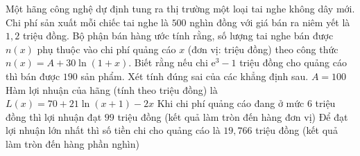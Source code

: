 \begin{ex}%
	Một hãng công nghệ dự định tung ra thị trường một loại tai nghe không dây mới. Chi phí sản xuất mỗi chiếc tai nghe là $500$ nghìn đồng với giá bán ra niêm yết là $1{,}2$ triệu đồng. Bộ phận bán hàng ước tính rằng, số lượng tai nghe bán được $n(x)$ phụ thuộc vào chi phí quảng cáo $x$ (đơn vị: triệu đồng) theo công thức $n(x)=A+30\ln (1+x)$. Biết rằng nếu chi $\mathrm{e}^3-1$ triệu đồng cho quảng cáo thì bán được $190$ sản phẩm. Xét tính đúng sai của các khẳng định sau.
	\choiceTF
	{\True $A=100$}
	{Hàm lợi nhuận của hãng (tính theo triệu đồng) là $L(x)=70+21\ln(x+1)-2x$}
	{Khi chi phí quảng cáo đang ở mức $6$ triệu đồng thì lợi nhuận đạt $99$ triệu đồng (kết quả làm tròn đến hàng đơn vị)}
	{Để đạt lợi nhuận lớn nhất thì số tiền chi cho quảng cáo là $19{,}766$ triệu đồng (kết quả làm tròn đến hàng phần nghìn)}
\end{ex}
